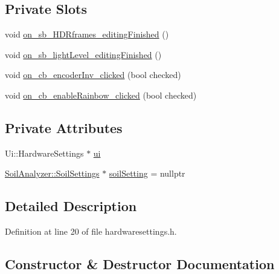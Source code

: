 \subsection*{Private Slots}
\begin{DoxyCompactItemize}
\item 
void \hyperlink{class_hardware_settings_a667f301ecd49dd8d8df164ec27568f91}{on\+\_\+sb\+\_\+\+H\+D\+Rframes\+\_\+editing\+Finished} ()
\item 
void \hyperlink{class_hardware_settings_a2eee1385ac9ad1ad88d04c7682ee8c2c}{on\+\_\+sb\+\_\+light\+Level\+\_\+editing\+Finished} ()
\item 
void \hyperlink{class_hardware_settings_a3127a1b2e53d6ac09e20391a0b6c9920}{on\+\_\+cb\+\_\+encoder\+Inv\+\_\+clicked} (bool checked)
\item 
void \hyperlink{class_hardware_settings_a4febc1e4a9e63c81ab74347bb1f66fe2}{on\+\_\+cb\+\_\+enable\+Rainbow\+\_\+clicked} (bool checked)
\end{DoxyCompactItemize}
\subsection*{Private Attributes}
\begin{DoxyCompactItemize}
\item 
Ui\+::\+Hardware\+Settings $\ast$ \hyperlink{class_hardware_settings_ae46cc8fe1f4247ab95bedf9bd5c14557}{ui}
\item 
\hyperlink{class_soil_analyzer_1_1_soil_settings}{Soil\+Analyzer\+::\+Soil\+Settings} $\ast$ \hyperlink{class_hardware_settings_a01cb694c4dbf49199d239a890639dce6}{soil\+Setting} = nullptr
\end{DoxyCompactItemize}


\subsection{Detailed Description}


Definition at line 20 of file hardwaresettings.\+h.



\subsection{Constructor \& Destructor Documentation}
\hypertarget{class_hardware_settings_a354b31caf3670eadd6b60cd6dd01c315}{}
